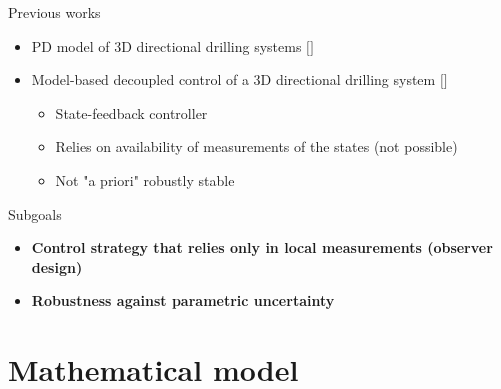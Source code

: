 \documentclass{beamer}
\begin{document}
\begin{frame}{Previous works}
	\begin{itemize}\setlength\itemsep{2.5em}
		\item PD model of 3D directional drilling systems $[$\cite{Perneder2013}$]$
		\item Model-based decoupled control of a 3D directional drilling system $[$\cite{Monsieurs2015}$]$
		\begin{itemize}\setlength\itemsep{1em}
			\item State-feedback controller
			\item Relies on availability of measurements of the states (not possible)
			\item Not "a priori" robustly stable 
		\end{itemize}
	\end{itemize}
\end{frame}

\begin{frame}{Subgoals}
	\begin{itemize}\setlength\itemsep{2.5em}
		\item \textbf{Control strategy that relies only in local measurements (observer design)}
		\item \textbf{Robustness against parametric uncertainty}
	\end{itemize}
\end{frame}

\section{Mathematical model}
\end{document}
